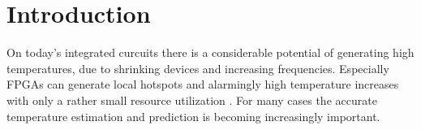 \chapter{Introduction}
\label{ch:introduction}

On today's integrated curcuits there is a considerable potential of generating high temperatures, due to shrinking devices and increasing frequencies. Especially FPGAs can generate local hotspots and alarmingly high temperature increases with only a rather small resource utilization \cite{Agne2013}. For many cases the accurate temperature estimation and prediction is becoming increasingly important.